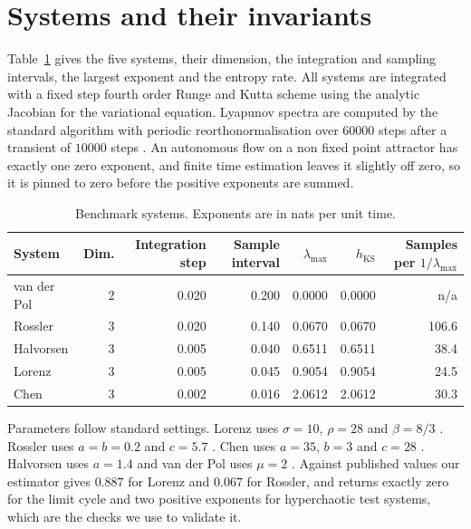 \documentclass{article}
\begin{document}
\section{Systems and their invariants}

Table~\ref{tab:systems} gives the five systems, their dimension, the integration and sampling intervals, the largest exponent and the entropy rate. All systems are integrated with a fixed step fourth order Runge and Kutta scheme using the analytic Jacobian for the variational equation. Lyapunov spectra are computed by the standard algorithm with periodic reorthonormalisation over $60000$ steps after a transient of $10000$ steps \citep{benettin1980}. An autonomous flow on a non fixed point attractor has exactly one zero exponent, and finite time estimation leaves it slightly off zero, so it is pinned to zero before the positive exponents are summed.

\begin{table}[h]
  \centering
  \caption{Benchmark systems. Exponents are in nats per unit time.}
  \label{tab:systems}
  \small
  \begin{tabular}{lrrrrrr}
    \toprule
    System & Dim. & Integration step & Sample interval & $\lambda_{\max}$ & $h_{\mathrm{KS}}$ & Samples per $1/\lambda_{\max}$ \\
    \midrule
    van der Pol & 2 & 0.020 & 0.200 & 0.0000 & 0.0000 & n/a \\
    Rossler     & 3 & 0.020 & 0.140 & 0.0670 & 0.0670 & 106.6 \\
    Halvorsen   & 3 & 0.005 & 0.040 & 0.6511 & 0.6511 & 38.4 \\
    Lorenz      & 3 & 0.005 & 0.045 & 0.9054 & 0.9054 & 24.5 \\
    Chen        & 3 & 0.002 & 0.016 & 2.0612 & 2.0612 & 30.3 \\
    \bottomrule
  \end{tabular}
\end{table}

Parameters follow standard settings. Lorenz uses $\sigma = 10$, $\rho = 28$ and $\beta = 8/3$ \citep{lorenz1963}. Rossler uses $a = b = 0.2$ and $c = 5.7$ \citep{rossler1976}. Chen uses $a = 35$, $b = 3$ and $c = 28$ \citep{chen1999}. Halvorsen uses $a = 1.4$ and van der Pol uses $\mu = 2$ \citep{sprott2010, vanderpol1926}. Against published values our estimator gives $0.887$ for Lorenz and $0.067$ for Rossler, and returns exactly zero for the limit cycle and two positive exponents for hyperchaotic test systems, which are the checks we use to validate it.
\end{document}
